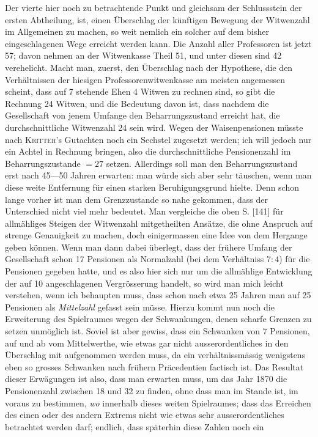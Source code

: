 Der vierte hier noch zu betrachtende Punkt und gleichsam der Schlussstein der ersten Abtheilung, ist, einen Überschlag der künftigen Bewegung der Witwenzahl im Allgemeinen zu machen, so weit nemlich ein solcher auf dem bisher eingeschlagenen Wege erreicht werden kann. Die Anzahl aller Professoren ist jetzt 57; davon nehmen an der Witwenkasse Theil 51, und unter diesen sind 42 verehelicht. Macht man, zuerst, den Überschlag nach der Hypothese, die den Verhältnissen der hiesigen Professorenwitwenkasse am meisten angemessen scheint, dass auf 7 stehende Ehen 4 Witwen zu rechnen sind, so gibt die Rechnung 24 Witwen, und die Bedeutung davon ist, dass nachdem die Gesellschaft von jenem Umfange den Beharrungszustand erreicht hat, die durchschnittliche Witwenzahl 24 sein wird. Wegen der Waisenpensionen müsste nach \textsc{Kritter}’s Gutachten noch ein Sechstel zugesetzt werden; ich will jedoch nur ein Achtel in Rechnung bringen, also die durchschnittliche Pensionenzahl im Beharrungszustande \(=27\) setzen. Allerdings soll man den Beharrungszustand erst nach 45—50 Jahren erwarten: man würde sich aber sehr täuschen, wenn man diese weite Entfernung für einen starken Beruhigungsgrund hielte. Denn schon lange vorher ist man dem Grenzzustande so nahe gekommen, dass der Unterschied nicht viel mehr bedeutet. Man vergleiche die oben S. [141] für allmähliges Steigen der Witwenzahl mitgetheilten Ansätze, die ohne Anspruch auf strenge Genauigkeit zu machen, doch einigermassen eine Idee von dem Hergange geben können. Wenn man dann dabei überlegt, dass der frühere Umfang der Gesellschaft schon 17 Pensionen als Normalzahl (bei dem Verhältniss \(7:4\)) für die Pensionen gegeben hatte, und es also hier sich nur um die allmählige Entwicklung der auf 10 angeschlagenen Vergrösserung handelt, so wird man mich leicht verstehen, wenn ich behaupten muss, dass schon nach etwa 25 Jahren man auf 25 Pensionen als \textit{Mittelzahl} gefasst sein müsse. Hierzu kommt nun noch die Erweiterung des Spielraumes wegen der Schwankungen, denen scharfe Grenzen zu setzen unmöglich ist. Soviel ist aber gewiss, dass ein Schwanken von 7 Pensionen, auf und ab vom Mittelwerthe, wie etwas gar nicht ausserordentliches in den Überschlag mit aufgenommen werden muss, da ein verhältnissmässig wenigstens eben so grosses Schwanken nach frühern Präcedentien factisch ist. Das Resultat dieser Erwägungen ist also, dass man erwarten muss, um das Jahr 1870 die Pensionenzahl zwischen 18 und 32 zu finden, ohne dass man im Stande ist, im voraus zu bestimmen, \textit{wo} innerhalb dieses weiten Spielraumes; dass das Erreichen des einen oder des andern Extrems nicht wie etwas sehr ausserordentliches betrachtet werden darf; endlich, dass späterhin diese Zahlen noch ein
